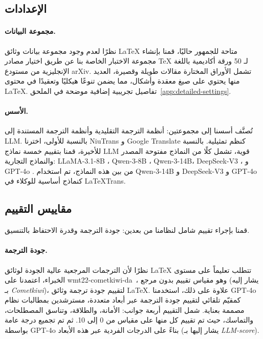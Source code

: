 \documentclass[11pt]{article}
\begin{document}
\subsection{الإعدادات}
\paragraph{مجموعة البيانات.}
نظرًا لعدم وجود مجموعة بيانات وثائق LaTeX متاحة للجمهور حاليًا، قمنا بإنشاء مجموعة الاختبار الخاصة بنا عن طريق اختيار مصادر TeX لـ 50 ورقة أكاديمية باللغة الإنجليزية من مستودع arXiv. تشمل الأوراق المختارة مقالات طويلة وقصيرة، العديد منها يحتوي على صيغ معقدة وأشكال، مما يضمن تنوعًا هيكليًا وتعقيدًا في محتوى LaTeX. 
تفاصيل تجريبية إضافية موضحة في الملحق~\ref{app:detailed-settings}.

\paragraph{الأسس.}
تُصنَّف أسسنا إلى مجموعتين: أنظمة الترجمة التقليدية وأنظمة الترجمة المستندة إلى LLM. بالنسبة للأولى، اخترنا NiuTrans و Google Translate كنظم تمثيلية. بالنسبة للأخيرة، قمنا بتقييم خمسة نماذج LLM قوية، تشمل كلًا من النماذج مفتوحة المصدر والنماذج التجارية: LLaMA-3.1-8B \cite{grattafiori2024llama}، Qwen-3-8B \cite{yang2025qwen3}، Qwen-3-14B، DeepSeek-V3 \cite{liu2024deepseek}، و GPT-4o \cite{hurst2024gpt}. من بين هذه النماذج، تم استخدام Qwen-3-14B و DeepSeek-V3 و GPT-4o كنماذج أساسية للوكلاء في LaTeXTrans.
\subsection{مقاييس التقييم}
قمنا بإجراء تقييم شامل لنظامنا من بعدين: جودة الترجمة وقدرة الاحتفاظ بالتنسيق.
\paragraph{جودة الترجمة.}
نظرًا لأن الترجمات المرجعية عالية الجودة لوثائق LaTeX تتطلب تعليماً على مستوى الخبراء، اعتمدنا على wmt22-cometkiwi-da~\cite{rei2022cometkiwiistunbabel2022submission}، وهو مقياس تقييم بدون مرجع (يشار إليه بـ \textit{Cometkiwi})، لتقييم جودة ترجمة وثائق LaTeX. علاوة على ذلك، استخدمنا GPT-4o كمقيّم تلقائي لتقييم جودة الترجمة عبر أبعاد متعددة، مسترشدين بمطالبات نظام مصممة بعناية. شمل التقييم أربعة جوانب: الأمانة، والطلاقة، وتناسق المصطلحات، والتماسك، حيث تم تقييم كل منها على مقياس من 0 إلى 10. ثم تم تجميع درجة عامة بواسطة GPT-4o بناءً على الدرجات الفردية عبر هذه الأبعاد (يشار إليها بـ \textit{LLM-score}).
\end{document}
